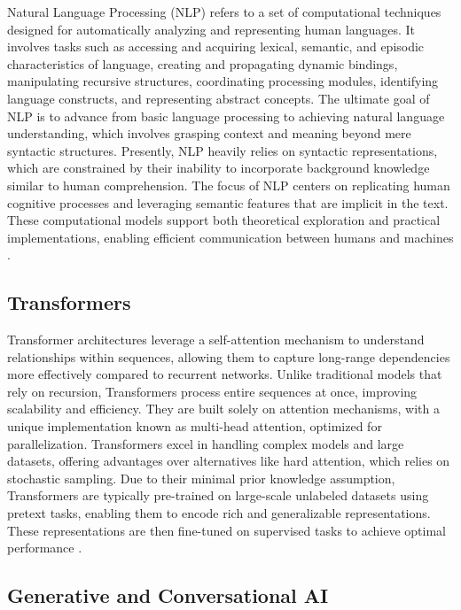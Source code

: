 Natural Language Processing (NLP) refers to a set of computational techniques designed for automatically analyzing and representing human languages. It involves tasks such as accessing and acquiring lexical, semantic, and episodic characteristics of language, creating and propagating dynamic bindings, manipulating recursive structures, coordinating processing modules, identifying language constructs, and representing abstract concepts. The ultimate goal of NLP is to advance from basic language processing to achieving natural language understanding, which involves grasping context and meaning beyond mere syntactic structures. Presently, NLP heavily relies on syntactic representations, which are constrained by their inability to incorporate background knowledge similar to human comprehension. The focus of NLP centers on replicating human cognitive processes and leveraging semantic features that are implicit in the text. These computational models support both theoretical exploration and practical implementations, enabling efficient communication between humans and machines \cite{Chowdhary2020}.

\subsection{Transformers}
Transformer architectures leverage a self-attention mechanism to understand relationships within sequences, allowing them to capture long-range dependencies more effectively compared to recurrent networks. Unlike traditional models that rely on recursion, Transformers process entire sequences at once, improving scalability and efficiency. They are built solely on attention mechanisms, with a unique implementation known as multi-head attention, optimized for parallelization. Transformers excel in handling complex models and large datasets, offering advantages over alternatives like hard attention, which relies on stochastic sampling. Due to their minimal prior knowledge assumption, Transformers are typically pre-trained on large-scale unlabeled datasets using pretext tasks, enabling them to encode rich and generalizable representations. These representations are then fine-tuned on supervised tasks to achieve optimal performance \cite{KhanNHZKS}.

\subsection{Generative and Conversational AI}

